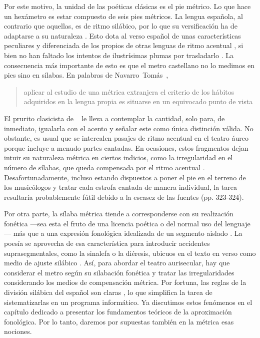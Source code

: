 Por este motivo, la unidad de las poéticas clásicas es el pie métrico. Lo que hace un hexámetro es estar compuesto de seis pies métricos. La lengua española, al contrario que aquellas, es de ritmo silábico, por lo que su versificación ha de adaptarse a su naturaleza \parencites[20]{herrero1996}[27-30]{torre1999}[21]{quilis2013}. Esto dota al verso español de unas características peculiares y diferenciada de los propios de otras lenguas de ritmo acentual \parencite[54-55]{cantero2002}, si bien no han faltado los intentos de ilustrísimas plumas por trasladarlo \parencite{dfernandez2021}. La consecuencia más importante de esto es que el metro castellano no lo medimos en pies sino en sílabas. En palabras de Navarro~Tomás~\parencite*[34]{navarrotomas1991}, \blockquote{aplicar al estudio de una métrica extranjera el criterio de los hábitos adquiridos en la lengua propia es situarse en un equivocado punto de vista}. El prurito clasicista de \citeauthor{diazrengifo2012}~\parencite*[174]{diazrengifo2012} le lleva a contemplar la cantidad, solo para, de inmediato, igualarla con el acento y señalar este como única distinción válida. No obstante, es usual que se intercalen pasajes de ritmo acentual en el teatro áureo porque incluye a menudo partes cantadas. En ocasiones, estos fragmentos dejan intuir su naturaleza métrica en ciertos indicios, como la irregularidad en el número de sílabas, que queda compensada por el ritmo acentual \parencite[416-417]{torrente2016}. Desafortunadamente, incluso estando dispuestos a poner el pie en el terreno de los musicólogos y tratar cada estrofa cantada de manera individual, la tarea resultaría probablemente fútil debido a la escasez de las fuentes (pp. 323-324).

 Por otra parte, la sílaba métrica tiende a corresponderse con su realización fonética —sea esta el fruto de una licencia poética o del normal uso del lenguaje— más que a una expresión fonológica idealizada de un segmento aislado \parencite[53]{dominguez2014a}. La poesía se aprovecha de esa característica para introducir accidentes suprasegmentales, como la sinalefa o la diéresis, ubicuos en el texto en verso como medio de ajuste silábico \parencite[55-59]{dominguez2014a}. Así, para abordar el teatro aurisecular, hay que considerar el metro según su silabación fonética y tratar las irregularidades considerando los medios de compensación métrica. Por fortuna, las reglas de la división silábica del español son claras \parencite{hualde1991}, lo que simplifica la tarea de sistematizarlas en un programa informático. Ya discutimos estos fenómenos en el capítulo dedicado a presentar los fundamentos teóricos de la aproximación fonológica. Por lo tanto, daremos por supuestas también en la métrica esas nociones.
 
